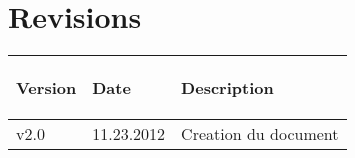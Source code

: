 \part*{Revisions}

%
%

\begin{tabular}{|p{2cm}|p{2cm}|p{6cm}|}
	\hline
		\rowcolor{table_header_color} 
		\begin{bf}Version\end{bf} & \begin{bf}Date\end{bf} & \begin{bf}Description\end{bf} \\
	\hline
		v2.0 & 11.23.2012 & Creation du document \\
	\hline	
\end{tabular}